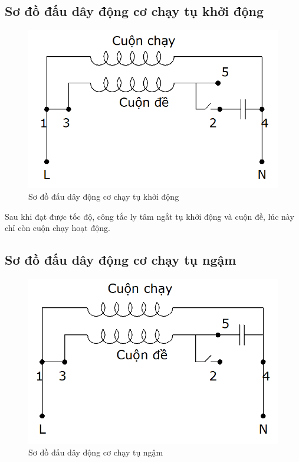 \documentclass[13pt,a4paper]{extarticle}
\begin{document}
\subsection{Sơ đồ đấu dây động cơ chạy tụ khởi động}
\begin{figure}[!h]
\begin{center}
\includegraphics[scale=.4]{dau-day-thuc-te-1}
\end{center}
\caption{Sơ đồ đấu dây động cơ chạy tụ khởi động}\label{Fig:chay-de-1}
\end{figure}
Sau khi đạt được tốc độ, công tắc ly tâm ngắt tụ khởi động và cuộn đề, lúc này chỉ còn cuộn chạy hoạt động.
\subsection{Sơ đồ đấu dây động cơ chạy tụ ngậm}
\begin{figure}[!h]
\begin{center}
\includegraphics[scale=.4]{dau-day-thuc-te-2}
\end{center}
\caption{Sơ đồ đấu dây động cơ chạy tụ ngậm}\label{Fig:chay-de-11}
\end{figure}
\newpage
\end{document}
